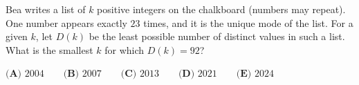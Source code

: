 Bea writes a list of $k$ positive integers on the chalkboard (numbers may repeat). One number appears exactly $23$ times, and it is the unique mode of the list. For a given $k$, let $D(k)$ be the least possible number of distinct values in such a list. What is the smallest $k$ for which $D(k)=92$?

$\textbf{(A) }2004\qquad\textbf{(B) }2007\qquad\textbf{(C) }2013\qquad\textbf{(D) }2021\qquad\textbf{(E) }2024$

